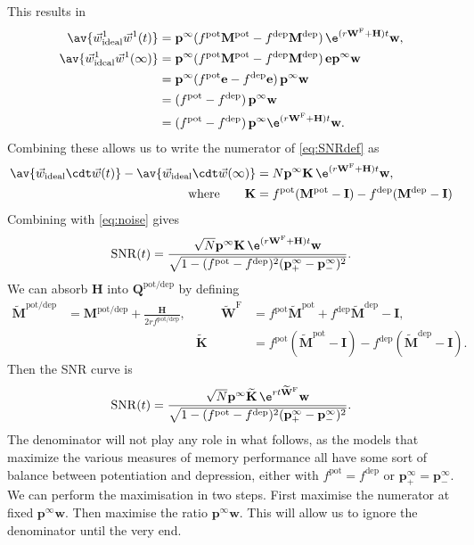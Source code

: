 \documentclass[12pt]{article}
\newcommand{\I}{\mathbf{I}}
\newcommand{\onev}{\mathbf{e}}
\newcommand{\MM}{\mathbf{Q}}
\newcommand{\pr}{\mathbf{p}}
\newcommand{\eq}{\pr^\infty}
\newcommand{\w}{\mathbf{w}}
\newcommand{\W}{\mathbf{W}}
\newcommand{\M}{\mathbf{M}}
\newcommand{\enc}{\mathbf{K}}
\newcommand{\frg}{\W^{\mathrm{F}}}
\newcommand{\pot}{^{\text{pot}}}
\newcommand{\dep}{^{\text{dep}}}
\newcommand{\potdep}{^{\text{pot/dep}}}
\renewcommand{\hom}{\mathbf{H}}
\newcommand{\Mh}{\widetilde{\M}}
\newcommand{\frgh}{\widetilde{\W}^{\mathrm{F}}}
\newcommand{\ench}{\widetilde{\enc}}
\newcommand{\syn}{\vec{w}}
\DeclareMathOperator{\SNR}{SNR}
\begin{document}
This results in
%
\begin{equation}\label{eq:overlapwt}
\begin{aligned}
  \av{\syn^1_\text{ideal}\syn^1(t)} &= \eq (f\pot\M\pot-f\dep\M\dep)\, \e^{(r\frg+\hom)t} \w, \\
  \av{\syn^1_\text{ideal}\syn^1(\infty)} &= \eq (f\pot\M\pot-f\dep\M\dep)\, \onev\eq \w \\
         &= \eq (f\pot\onev-f\dep\onev)\, \eq \w \\
         &=  (f\pot-f\dep)\, \eq \w \\
         &=  (f\pot-f\dep)\, \eq \e^{(r\frg+\hom)t} \w .
\end{aligned}
\end{equation}
%
Combining these allows us to write the numerator of \eqref{eq:SNRdef} as
%
\begin{equation}\label{eq:signal}
\begin{aligned}
  \av{\syn_\text{ideal}\cdt\syn(t)} - \av{\syn_\text{ideal}\cdt\syn(\infty)}
    &= N \eq \enc \, \e^{(r\frg+\hom)t} \w , \\
    \text{where} \qquad
  \enc &= f\pot(\M\pot-\I)-f\dep(\M\dep-\I)
\end{aligned}
\end{equation}
%
Combining with \eqref{eq:noise} gives
%
\begin{equation}\label{eq:SNRcurveExact}
  \SNR(t) = \frac{\sqrt{N} \eq \enc\,\e^{(r\frg+\hom)t}\w}
                 {\sqrt{1-(f\pot-f\dep)^2(\eq_+-\eq_-)^2}}.
\end{equation}
%
We can absorb $\hom$ into $\MM\potdep$ by defining
%
\begin{equation}\label{eq:absorbhom}
\begin{aligned}
  \Mh\potdep &= \M\potdep + \frac{\hom}{2rf\potdep},
  &\qquad
  \frgh &= f\pot\Mh\pot + f\dep\Mh\dep - \I,
  \\&&
  \ench &= f\pot(\Mh\pot-\I)-f\dep(\Mh\dep-\I).
\end{aligned}
\end{equation}
%
Then the SNR curve is
%
\begin{equation}\label{eq:SNRcurvehom}
  \SNR(t) = \frac{\sqrt{N}  \eq \ench \,\e^{rt\frgh}\w}
                 {\sqrt{1-(f\pot-f\dep)^2(\eq_+-\eq_-)^2}}.
\end{equation}
%
The denominator will not play any role in what follows, as the models that maximize the various measures of memory performance all have some sort of balance between potentiation and depression, either with $f\pot=f\dep$ or $\eq_+=\eq_-$.
We can perform the maximisation in two steps.
First maximise the numerator at fixed $\eq\w$.
Then maximise the ratio \wrt $\eq\w$.
This will allow us to ignore the denominator until the very end.
\end{document}
